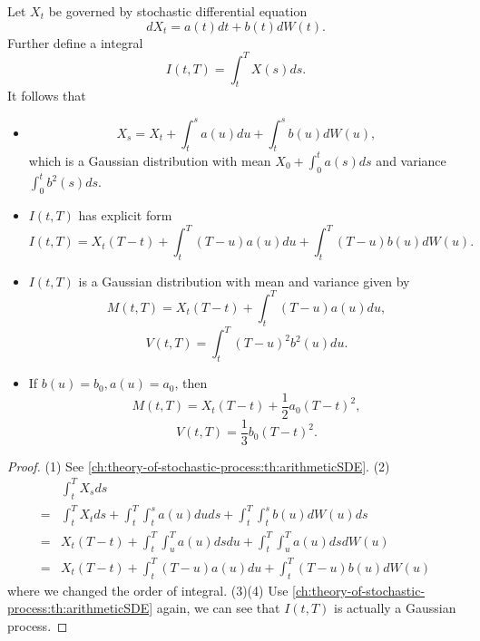 \begin{refsection}
\begin{lemma}\label{ch:theory-of-stochastic-process:th:IntegralarithmeticSDE} Let $X_t$ be governed by stochastic differential equation $$dX_t = a(t)dt + b(t)dW(t).$$
	Further define a integral $$I(t,T) = \int_t^T X(s)ds.$$
	It follows that
	\begin{itemize}
		\item $$X_s =  X_t + \int_t^sa(u)du + \int_t^sb(u)dW(u),$$
		which is a Gaussian distribution with mean $X_0+\int_0^ta(s)ds$ and variance $\int_0^t b^2(s)ds.$
		\item $I(t,T)$ has explicit form
		$$I(t,T) = X_t(T-t) + \int_t^T (T-u)a(u)du + \int_t^T(T-u)b(u)dW(u).$$
		\item $I(t,T)$ is a Gaussian distribution with mean and variance given by
		$$M(t,T) = X_t(T-t) + \int_t^T (T-u)a(u)du, $$
		$$V(t,T) = \int_t^T (T-u)^2b^2(u)du. $$
		\item If $b(u) = b_0, a(u) = a_0$, then
		$$M(t,T) = X_t(T-t) + \frac{1}{2}a_0(T-t)^2, $$
		$$V(t,T) = \frac{1}{3}b_0 (T-t)^2. $$
	\end{itemize}	
\end{lemma}
\begin{proof}
	(1) See \autoref{ch:theory-of-stochastic-process:th:arithmeticSDE}.	
	(2)
	\begin{align*}
	&\int_t^T X_s ds \\
	=& \int_t^T X_t ds +　\int_t^T\int_t^s a(u)duds + \int_t^T\int_t^s b(u) dW(u)ds \\
	=& X_t(T-t) + \int_t^T\int_u^T a(u)dsdu + \int_t^T\int_u^T a(u)ds dW(u) \\
	=& X_t(T-t) + \int_t^T (T-u)a(u)du + \int_t^T(T-u)b(u)dW(u)
	\end{align*}
	where we changed the order of integral.
	(3)(4) Use \autoref{ch:theory-of-stochastic-process:th:arithmeticSDE} again, we can see that $I(t,T)$ is actually a Gaussian process.	
\end{proof}



\end{refsection}
